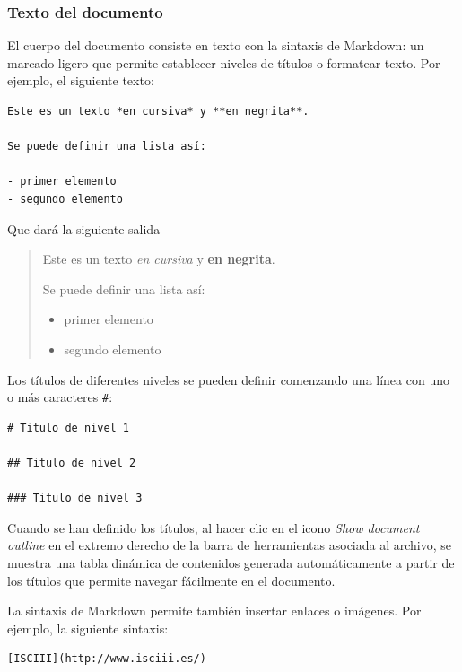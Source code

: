 \documentclass[
]{article}
\providecommand{\tightlist}{%
  \setlength{\itemsep}{0pt}\setlength{\parskip}{0pt}}
\numberwithin{ejcnt}{section}
\begin{document}
\hypertarget{texto-del-documento}{%
\subsubsection{Texto del documento}\label{texto-del-documento}}

El cuerpo del documento consiste en texto con la sintaxis de Markdown: un marcado ligero que permite establecer niveles de títulos o formatear texto. Por ejemplo, el siguiente texto:

\begin{verbatim}
Este es un texto *en cursiva* y **en negrita**.

Se puede definir una lista así:

- primer elemento
- segundo elemento
\end{verbatim}

Que dará la siguiente salida

\begin{quote}
Este es un texto \emph{en cursiva} y \textbf{en negrita}.

Se puede definir una lista así:

\begin{itemize}
\tightlist
\item
  primer elemento
\item
  segundo elemento
\end{itemize}
\end{quote}

Los títulos de diferentes niveles se pueden definir comenzando una línea con uno o más caracteres \texttt{\#}:

\begin{verbatim}
# Titulo de nivel 1

## Titulo de nivel 2

### Titulo de nivel 3
\end{verbatim}

Cuando se han definido los títulos, al hacer clic en el icono \emph{Show document outline} en el extremo derecho de la barra de herramientas asociada al archivo, se muestra una tabla dinámica de contenidos generada automáticamente a partir de los títulos que permite navegar fácilmente en el documento.

La sintaxis de Markdown permite también insertar enlaces o imágenes. Por ejemplo, la siguiente sintaxis:

\begin{verbatim}
[ISCIII](http://www.isciii.es/)
\end{verbatim}
\end{document}
